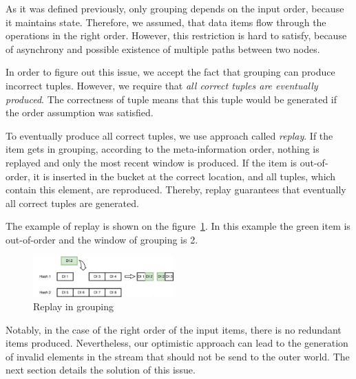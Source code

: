\label {fs-collision}

As it was defined previously, only grouping depends on the input order, because it maintains state. Therefore, we assumed, that data items flow through the operations in the right order. However, this restriction is hard to satisfy, because of asynchrony and possible existence of multiple paths between two nodes.

In order to figure out this issue, we accept the fact that grouping can produce incorrect tuples. However, we require that {\it all correct tuples are eventually produced}. The correctness of tuple means that this tuple would be generated if the order assumption was satisfied. 

To eventually produce all correct tuples, we use approach called {\it replay}. If the item gets in grouping, according to the meta-information order, nothing is replayed and only the most recent window is produced. If the item is out-of-order, it is inserted in the bucket at the correct location, and all tuples, which contain this element, are reproduced. Thereby, replay guarantees that eventually all correct tuples are generated.

The example of replay is shown on the figure~\ref{grouping-replaying-figure}. In this example the green item is out-of-order and the window of grouping is 2.

\begin{figure}[htbp]
  \centering
  \includegraphics[width=0.48\textwidth]{pics/grouping-replaying}
  \caption{Replay in grouping}
  \label {grouping-replaying-figure}
\end{figure}

Notably, in the case of the right order of the input items, there is no redundant items produced. Nevertheless, our optimistic approach can lead to the generation of invalid elements in the stream that should not be send to the outer world. The next section details the solution of this issue.
